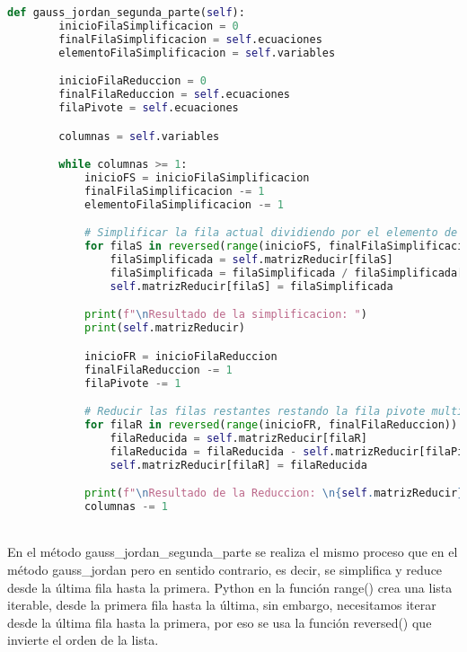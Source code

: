 \documentclass[letterpaper,12pt]{article}
\begin{document}
\\\\\begin{lstlisting}[style=jupyter, language=Python, caption={Método para resolver el sistema de ecuaciones}]
    def gauss_jordan_segunda_parte(self):
        inicioFilaSimplificacion = 0
        finalFilaSimplificacion = self.ecuaciones
        elementoFilaSimplificacion = self.variables

        inicioFilaReduccion = 0
        finalFilaReduccion = self.ecuaciones
        filaPivote = self.ecuaciones

        columnas = self.variables

        while columnas >= 1:
            inicioFS = inicioFilaSimplificacion
            finalFilaSimplificacion -= 1
            elementoFilaSimplificacion -= 1

            # Simplificar la fila actual dividiendo por el elemento de la columna correspondiente
            for filaS in reversed(range(inicioFS, finalFilaSimplificacion + 1)):
                filaSimplificada = self.matrizReducir[filaS]
                filaSimplificada = filaSimplificada / filaSimplificada[elementoFilaSimplificacion]
                self.matrizReducir[filaS] = filaSimplificada

            print(f"\nResultado de la simplificacion: ")
            print(self.matrizReducir)

            inicioFR = inicioFilaReduccion
            finalFilaReduccion -= 1
            filaPivote -= 1

            # Reducir las filas restantes restando la fila pivote multiplicada por el elemento correspondiente
            for filaR in reversed(range(inicioFR, finalFilaReduccion)):
                filaReducida = self.matrizReducir[filaR]
                filaReducida = filaReducida - self.matrizReducir[filaPivote]
                self.matrizReducir[filaR] = filaReducida

            print(f"\nResultado de la Reduccion: \n{self.matrizReducir}")
            columnas -= 1
\end{lstlisting}
\\
En el método \textcolor{jl_keyword}{gauss\_jordan\_segunda\_parte} se realiza el mismo proceso que en el método \textcolor{jl_keyword}{gauss\_jordan} pero en sentido contrario, es decir, se simplifica y reduce desde la última fila hasta la primera.
Python en la función range() crea una lista iterable, desde la primera fila hasta la última, sin embargo, necesitamos iterar desde la última fila hasta la primera, por eso se usa la función reversed() que invierte el orden de la lista.
\end{document}
